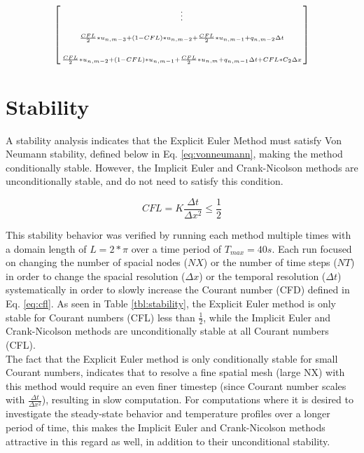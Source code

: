 \documentclass[10pt, letter, showtrims]{extarticle}
\begin{document}
\begin{fleqn}
\begin{equation}
\begin{medsize}
\begin{bmatrix}
\begin{smallmatrix}
							\vdots                                                   \\[1.5em]
							\frac{CFL}{2} * u_{n, m-3} + (1-CFL) * u_{n, m-2} + \frac{CFL}{2} * u_{n, m-1} + q_{n, m-2} \Delta t                         \\[1.5em]
							\frac{CFL}{2} * u_{n, m-2} + (1- CFL) * u_{n, m-1} + \frac{CFL}{2} * u_{n, m} + q_{n, m-1} \Delta t + CFL * C_{2} \Delta x
						\end{smallmatrix}
					\end{bmatrix}
				\end{medsize}
			\end{equation} 
		\end{fleqn}   		
		
		\pagebreak
		
		\section{Stability}
		
		\noindent
		A stability analysis indicates that the Explicit Euler Method must satisfy Von Neumann stability, defined below in Eq. \ref{eq:vonneumann}, making the method conditionally stable. However, the Implicit Euler and Crank-Nicolson methods are unconditionally stable, and do not need to satisfy this condition.
		
		\begin{equation}
		\label{eq:vonneumann}
			CFL = K\frac{\Delta t}{\Delta x^{2}} \leq \frac{1}{2}
		\end{equation}
		
		\noindent
		This stability behavior was verified by running each method multiple times with a domain length of $L = 2*\pi$ over a time period of $T_{max} = 40 s$. Each run focused on changing the number of spacial nodes ($NX$) or the number of time steps ($NT$) in order to change the spacial resolution ($\Delta x$) or the temporal resolution ($\Delta t$) systematically in order to slowly increase the Courant number (CFD) defined in Eq. \ref{eq:cfl}. As seen in Table \ref{tbl:stability}, the Explicit Euler method is only stable for Courant numbers (CFL) less than $\frac{1}{2}$, while the Implicit Euler and Crank-Nicolson methods are unconditionally stable at all Courant numbers (CFL).\\
		
		\noindent
		The fact that the Explicit Euler method is only conditionally stable for small Courant numbers, indicates that to resolve a fine spatial mesh (large NX) with this method would require an even finer timestep (since Courant number scales with $\frac{\Delta t}{\Delta x^{2}}$), resulting in slow computation. For computations where it is desired to investigate the steady-state behavior and temperature profiles over a longer period of time, this makes the Implicit Euler and Crank-Nicolson methods attractive in this regard as well, in addition to their unconditional stability.
		
\end{document}
